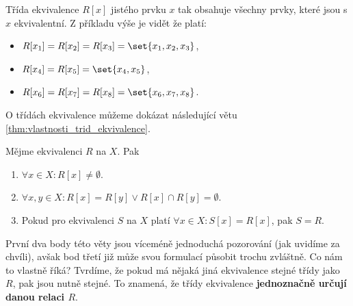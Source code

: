 Třída ekvivalence $R[x]$ jistého prvku $x$ tak obsahuje všechny prvky, které jsou s $x$ ekvivalentní. Z příkladu výše je vidět že platí:
\begin{itemize}
    \item $R[x_1]=R[x_2]=R[x_3]=\set{x_1,x_2,x_3}$,
    \item $R[x_4]=R[x_5]=\set{x_4,x_5}$,
    \item $R[x_6]=R[x_7]=R[x_8]=\set{x_6,x_7,x_8}$.
\end{itemize}
O třídách ekvivalence můžeme dokázat následující větu \ref{thm:vlastnosti_trid_ekvivalence}.
\begin{theorem}\label{thm:vlastnosti_trid_ekvivalence}
    Mějme ekvivalenci $R$ na $X$. Pak
    \begin{enumerate}[label=(\roman*)]
        \item $\forall x\in X: R[x]\neq\emptyset$.
        \item $\forall x,y\in X: R[x]=R[y] \lor R[x]\cap R[y]=\emptyset$.
        \item Pokud pro ekvivalenci $S$ na $X$ platí $\forall x\in X: S[x]=R[x]$, pak $S=R$.
    \end{enumerate}
\end{theorem}
První dva body této věty jsou víceméně jednoduchá pozorování (jak uvidíme za chvíli), avšak bod třetí již může svou formulací působit trochu zvláštně. Co nám to vlastně říká? Tvrdíme, že pokud má nějaká jiná ekvivalence stejné třídy jako $R$, pak jsou nutně stejné. To znamená, že třídy ekvivalence \textbf{jednoznačně určují danou relaci $R$}.
